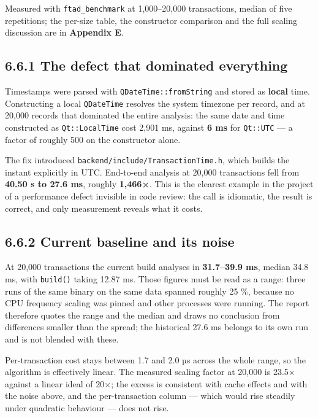 \documentclass[
  12pt,
]{report}
\begin{document}
Measured with \texttt{ftad\_benchmark} at 1,000--20,000 transactions,
median of five repetitions; the per-size table, the constructor
comparison and the full scaling discussion are in \textbf{Appendix E}.

\subsection{6.6.1 The defect that dominated
everything}\label{the-defect-that-dominated-everything}

Timestamps were parsed with \texttt{QDateTime::fromString} and stored as
\textbf{local} time. Constructing a local \texttt{QDateTime} resolves
the system timezone per record, and at 20,000 records that dominated the
entire analysis: the same date and time constructed as
\texttt{Qt::LocalTime} cost 2,901 ms, against \textbf{6 ms} for
\texttt{Qt::UTC} --- a factor of roughly 500 on the constructor alone.

The fix introduced \texttt{backend/\allowbreak{}include/\allowbreak{}TransactionTime.h}, which
builds the instant explicitly in UTC. End-to-end analysis at 20,000
transactions fell from \textbf{40.50 s to 27.6 ms}, roughly
\textbf{1,466×}. This is the clearest example in the project of a
performance defect invisible in code review: the call is idiomatic, the
result is correct, and only measurement reveals what it costs.

\subsection{6.6.2 Current baseline and its
noise}\label{current-baseline-and-its-noise}

At 20,000 transactions the current build analyses in \textbf{31.7--39.9
ms}, median 34.8 ms, with \texttt{build()} taking 12.87 ms. Those
figures must be read as a range: three runs of the same binary on the
same data spanned roughly 25 \%, because no CPU frequency scaling was
pinned and other processes were running. The report therefore quotes the
range and the median and draws no conclusion from differences smaller
than the spread; the historical 27.6 ms belongs to its own run and is
not blended with these.

Per-transaction cost stays between 1.7 and 2.0 µs across the whole
range, so the algorithm is effectively linear. The measured scaling
factor at 20,000 is 23.5× against a linear ideal of 20×; the excess is
consistent with cache effects and with the noise above, and the
per-transaction column --- which would rise steadily under quadratic
behaviour --- does not rise.
\end{document}
